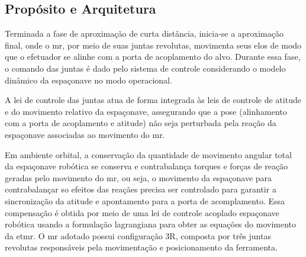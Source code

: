 \subsection{Propósito e Arquitetura}
\label{sec_proposito_arquitetura}

Terminada a fase de aproximação de curta distância, inicia-se a aproximação final, onde o \gls{mr}, por meio de suas juntas revolutas, movimenta seus elos de modo que o efetuador se alinhe com a porta de acoplamento do alvo.
Durante essa fase, o comando das juntas é dado pelo sistema de controle considerando o modelo dinâmico da espaçonave no modo operacional.

A lei de controle das juntas atua de forma integrada às leis de controle de atitude e do movimento relativo da espaçonave, assegurando que a pose (alinhamento com a porta de acoplamento e atitude) não seja perturbada pela reação da espaçonave associadas ao movimento do \gls{mr}.

Em ambiente orbital, a conservação da quantidade de movimento angular total da espaçonave robótica se conserva e contrabalança torques e forças de reação geradas pelo movimento do \gls{mr}, ou seja, o movimento da espaçonave para contrabalançar so efeitos das reaçães precisa ser controlado para garantir a sincronização da atitude e apontamento para a porta de acomplamento.
Essa compensação é obtida por meio de uma lei de controle acoplado espaçonave robótica usando a formulação lagrangiana para obter as equações do movimento da \gls{etmr}.
O \gls{mr} adotado possui configuração 3R, composta por três juntas revolutas responsáveis pela movimentação e posicionamento da ferramenta.